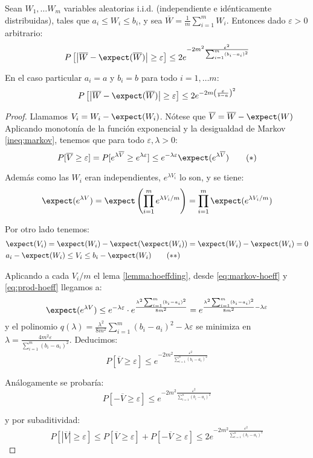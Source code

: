 \begin{lemma}
 Sean $W_1, \ldots W_m$ variables aleatorias i.i.d. (independiente e idénticamente distribuidas), tales que 
 $a_i \le W_i \le b_i$, y sea $\overline{W} = \frac{1}{m} \sum_{i=1}^m W_i$. Entonces dado $\varepsilon > 0$ arbitrario:
 \[
   P\left[\left| \overline{W} - \expect(\overline{W}) \right| \ge \varepsilon \right] \le 2e^{-2m^2 \frac{\varepsilon^2}{\sum_{i=1}^m (b_i-a_i)^2}}
 \]
 
 En el caso particular $a_i = a$ y $b_i = b$ para todo $i=1, \ldots m$:
 \[
   P\left[\left| \overline{W} - \expect(\overline{W}) \right| \ge \varepsilon \right] \le 2e^{-2m \left(\frac{\varepsilon}{b-a}\right)^2}
 \] 
 \label{ineq:hoeffding}
\end{lemma}

\begin{proof}
 Llamamos $V_i = W_i - \expect(W_i)$. Nótese que $\overline{V} = \overline{W} - \expect(W)$
 Aplicando monotonía de la función exponencial y la desigualdad de Markov \ref{ineq:markov}, tenemos que 
 para todo $\varepsilon, \lambda > 0$:
 \begin{equation}
 P[\overline{V} \ge \varepsilon] = P[e^{\lambda\overline{V}} \ge e^{\lambda \varepsilon}]
 \le e^{-\lambda \varepsilon} \expect(e^{\lambda \overline{V}})
 \label{eq:markov-hoeff}\tag{$\ast$}
 \end{equation}
 
 Además como las $W_i$ eran independientes, $e^{\lambda V_i}$ lo son, y se tiene:
 \[
   \expect(e^{\lambda V}) = \expect\left(\prod_{i=1}^m e^{\lambda V_i / m}\right) = \prod_{i=1}^m \expect(e^{\lambda V_i/m})
 \]
 
 Por otro lado tenemos:
 \begin{align}
  & \expect(V_i) = \expect(W_i) - \expect(\expect(W_i)) = \expect(W_i) - \expect(W_i) = 0 \nonumber \\
  & a_i-\expect(W_i) \le V_i \le b_i-\expect(W_i)
  \label{eq:prod-hoeff}\tag{$\ast$$\ast$}
 \end{align}
 
 Aplicando a cada $V_i/m$ el lema \ref{lemma:hoeffding}, desde \eqref{eq:markov-hoeff} y \eqref{eq:prod-hoeff} 
 llegamos a:
 \[
   \expect(e^{\lambda V}) \le e^{-\lambda \varepsilon} \cdot e^{\frac{\lambda^2 \sum_{i=1}^m(b_i-a_i)^2}{8m^2}} = 
   e^{\frac{\lambda^2 \sum_{i=1}^m(b_i-a_i)^2}{8m^2} - \lambda\varepsilon}
 \]
 y el polinomio $q(\lambda)= \frac{\lambda^2}{8m^2} \sum_{i=1}^m(b_i-a_i)^2 - \lambda\varepsilon$ se minimiza en 
 $\lambda = \frac{4m^2\varepsilon}{\sum_{i=1}^m(b_i-a_i)^2}$. Deducimos:
 \[
   P[\overline{V} \ge \varepsilon] \le e^{-2m^2 \frac{\varepsilon^2}{\sum_{i=1}^n (b_i-a_i)^2}}
 \]
 
 Análogamente se probaría:
 \[
   P[-\overline{V} \ge \varepsilon] \le e^{-2m^2 \frac{\varepsilon^2}{\sum_{i=1}^n (b_i-a_i)^2}}
 \]
 
 y por subaditividad: 
 \[
   P[|\overline{V}| \ge \varepsilon] \le P[\overline{V} \ge \varepsilon] + P[-\overline{V} \ge \varepsilon]
   \le 2e^{-2m^2 \frac{\varepsilon^2}{\sum_{i=1}^n (b_i-a_i)^2}}
 \]
 
\end{proof}
